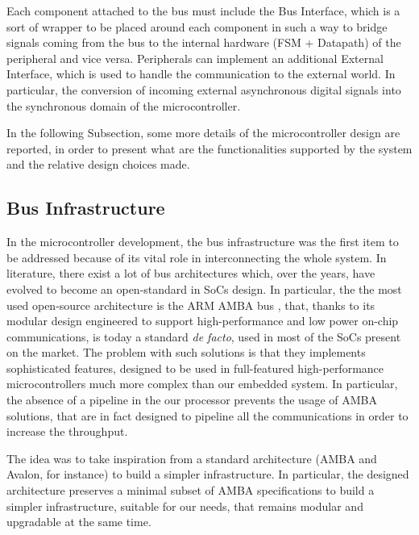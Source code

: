 Each component attached to the bus must include the Bus Interface, which is a sort of wrapper to be placed around each component in such a way to bridge signals coming from the bus to the internal hardware (FSM + Datapath) of the peripheral and vice versa. Peripherals can implement an additional External Interface, which is used to handle the communication to the external world. In particular, the conversion of incoming external asynchronous digital signals into the synchronous domain of the microcontroller.

In the following Subsection, some more details of the microcontroller design are reported, in order to present what are the functionalities supported by the system and the relative design choices made.

\subsection{Bus Infrastructure}
In the microcontroller development, the bus infrastructure was the first item to be addressed because of its vital role in interconnecting the whole system. In literature, there exist a lot of bus architectures which, over the years, have evolved to become an open-standard in SoCs design. In particular, the the most used open-source architecture is the ARM AMBA bus \cite{ambaAHB} \cite{ambaAPB}, that, thanks to its modular design engineered to support high-performance and low power on-chip communications, is today a standard \emph{de facto}, used in most of the SoCs present on the market. The problem with such solutions is that they implements sophisticated features, designed to be used in full-featured high-performance microcontrollers much more complex than our embedded system. In particular, the absence of a pipeline in the our processor prevents the usage of AMBA solutions, that are in fact designed to pipeline all the communications in order to increase the throughput.

The idea was to take inspiration from a standard architecture (AMBA and Avalon, for instance) to build a simpler infrastructure. In particular, the designed architecture preserves a minimal subset of AMBA specifications to build a simpler infrastructure, suitable for our needs, that remains modular and upgradable at the same time.

